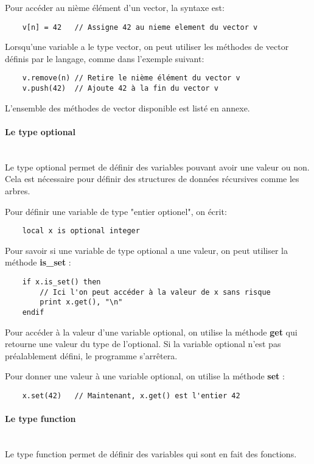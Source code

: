 Pour accéder au nième élément d'un vector, la syntaxe est:
\begin{verbatim}
    v[n] = 42   // Assigne 42 au nieme element du vector v
\end{verbatim}

Lorsqu'une variable a le type vector, on peut utiliser les méthodes de vector
définis par le langage, comme dans l'exemple suivant:
\begin{verbatim}
    v.remove(n) // Retire le nième élément du vector v
    v.push(42)  // Ajoute 42 à la fin du vector v
\end{verbatim}

L'ensemble des méthodes de vector disponible est listé en annexe.


\paragraph{Le type optional}\mbox{} \\
Le type optional permet de définir des variables pouvant avoir une valeur ou
non. Cela est nécessaire pour définir des structures de données récursives
comme les arbres.

Pour définir une variable de type "entier optionel", on écrit:
\begin{verbatim}
    local x is optional integer
\end{verbatim}

Pour savoir si une variable de type optional a une valeur, on peut utiliser
la méthode \textbf{is\_set} :
\begin{verbatim}
    if x.is_set() then
        // Ici l'on peut accéder à la valeur de x sans risque
        print x.get(), "\n"
    endif
\end{verbatim}

Pour accéder à la valeur d'une variable optional, on utilise la méthode
\textbf{get} qui retourne une valeur du type de l'optional. Si la variable
optional n'est pas préalablement défini, le programme s'arrêtera.

Pour donner une valeur à une variable optional, on utilise la méthode
\textbf{set} :
\begin{verbatim}
    x.set(42)   // Maintenant, x.get() est l'entier 42
\end{verbatim}


\paragraph{Le type function}\mbox{} \\
Le type function permet de définir des variables qui sont en fait des fonctions.

